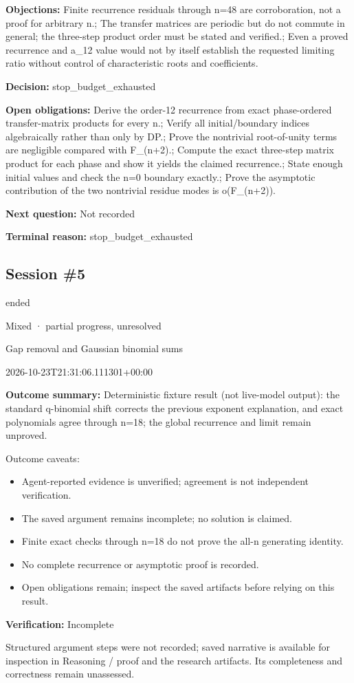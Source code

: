 \documentclass[11pt]{article}
\begin{document}
\textbf{Objections:} Finite recurrence residuals through n=48 are corroboration, not a proof for arbitrary n.; The transfer matrices are periodic but do not commute in general; the three-step product order must be stated and verified.; Even a proved recurrence and a\_12 value would not by itself establish the requested limiting ratio without control of characteristic roots and coefficients.\par
\textbf{Decision:} stop\_budget\_exhausted\par
\textbf{Open obligations:} Derive the order-12 recurrence from exact phase-ordered transfer-matrix products for every n.; Verify all initial/boundary indices algebraically rather than only by DP.; Prove the nontrivial root-of-unity terms are negligible compared with F\_(n+2).; Compute the exact three-step matrix product for each phase and show it yields the claimed recurrence.; State enough initial values and check the n=0 boundary exactly.; Prove the asymptotic contribution of the two nontrivial residue modes is o(F\_(n+2)).\par
\textbf{Next question:} Not recorded\par
\textbf{Terminal reason:} stop\_budget\_exhausted\par
\subsection{Session \#5}
\begin{description}[style=nextline,font=\normalfont\bfseries,leftmargin=0pt,labelsep=0pt]
\item[Execution status] ended
\item[Outcome] Mixed · partial progress, unresolved
\item[Strategy] Gap removal and Gaussian binomial sums
\item[Started] 2026-10-23T21:31:06.111301+00:00
\end{description}
\textbf{Outcome summary:} Deterministic fixture result (not live-model output): the standard q-binomial shift corrects the previous exponent explanation, and exact polynomials agree through n=18; the global recurrence and limit remain unproved.\par
Outcome caveats:\par
\begin{itemize}
\item Agent-reported evidence is unverified; agreement is not independent verification.
\item The saved argument remains incomplete; no solution is claimed.
\item Finite exact checks through n=18 do not prove the all-n generating identity.
\item No complete recurrence or asymptotic proof is recorded.
\item Open obligations remain; inspect the saved artifacts before relying on this result.
\end{itemize}
\textbf{Verification:} Incomplete\par
Structured argument steps were not recorded; saved narrative is available for inspection in Reasoning / proof and the research artifacts. Its completeness and correctness remain unassessed.\par
\end{document}

